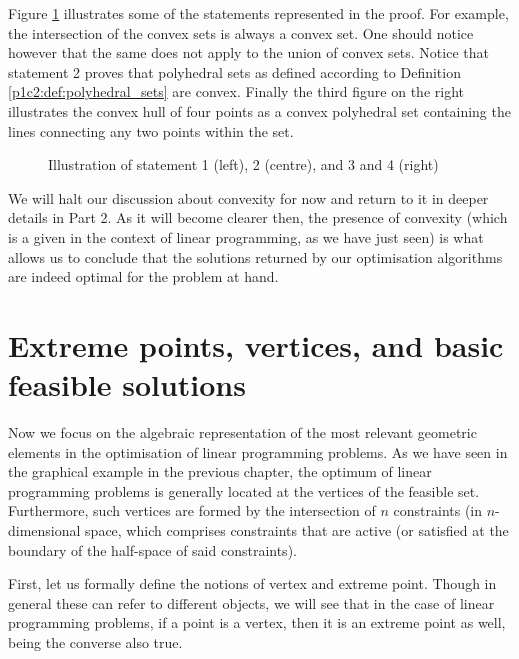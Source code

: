Figure \ref{p1c2:fig:convexity_theorem_examples} illustrates some of the statements represented in the proof. For example, the intersection of the convex sets is always a convex set. One should notice however that the same does not apply to the union of convex sets. Notice that statement 2 proves that polyhedral sets as defined according to Definition \ref{p1c2:def:polyhedral_sets} are convex. Finally the third figure on the right illustrates the convex hull of four points as a convex polyhedral set containing the lines connecting any two points within the set. 
 
\begin{figure}
    \vspace{-6pt}
	\caption{Illustration of statement 1 (left), 2 (centre), and 3 and 4 (right)} \label{p1c2:fig:convexity_theorem_examples}
\end{figure}	

We will halt our discussion about convexity for now and return to it in deeper details in Part 2. As it will become clearer then, the presence of convexity (which is a given in the context of linear programming, as we have just seen) is what allows us to conclude that the solutions returned by our optimisation algorithms are indeed optimal for the problem at hand. 


\section{Extreme points, vertices, and basic feasible solutions}

Now we focus on the algebraic representation of the most relevant geometric elements in the optimisation of linear programming problems. As we have seen in the graphical example in the previous chapter, the optimum of linear programming problems is generally located at the vertices of the feasible set. Furthermore, such vertices are formed by the intersection of $n$ constraints (in $n$-dimensional space, which comprises constraints that are active (or satisfied at the boundary of the half-space of said constraints).

First, let us formally define the notions of vertex and extreme point. Though in general these can refer to different objects, we will see that in the case of linear programming problems, if a point is a vertex, then it is an extreme point as well, being the converse also true.

